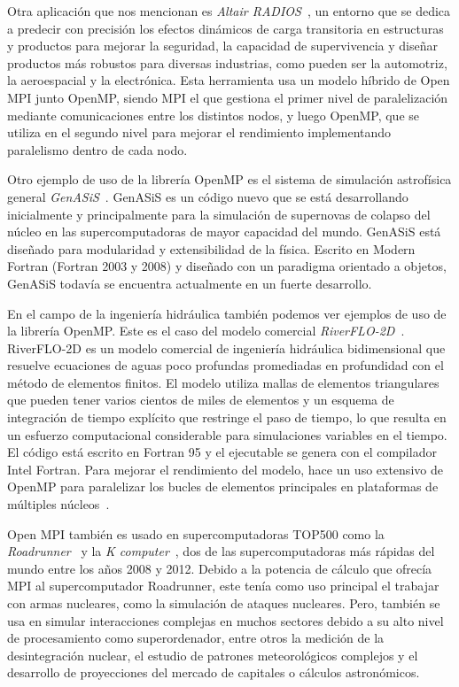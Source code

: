 \documentclass[a4paper,12pt]{article}
\begin{document}
Otra aplicación que nos mencionan es {\it Altair RADIOS}~\cite{altair}, un entorno que se dedica a predecir con precisión los efectos dinámicos de carga transitoria en estructuras y productos para mejorar la seguridad, la capacidad de supervivencia y diseñar productos más robustos para diversas industrias, como pueden ser la automotriz, la aeroespacial y la electrónica. Esta herramienta usa un modelo híbrido de Open MPI junto OpenMP, siendo MPI el que gestiona el primer nivel de paralelización mediante comunicaciones entre los distintos nodos, y luego OpenMP, que se utiliza en el segundo nivel para mejorar el rendimiento implementando paralelismo dentro de cada nodo.


Otro ejemplo de uso de la librería OpenMP es el sistema de simulación astrofísica general {\it GenASiS}~\cite{genasis}. GenASiS es un código nuevo que se está desarrollando inicialmente y principalmente para la simulación de supernovas de colapso del núcleo en las supercomputadoras de mayor capacidad del mundo. GenASiS está diseñado para modularidad y extensibilidad de la física. Escrito en Modern Fortran (Fortran 2003 y 2008) y diseñado con un paradigma orientado a objetos, GenASiS todavía se encuentra actualmente en un fuerte desarrollo.

En el campo de la ingeniería hidráulica también podemos ver ejemplos de uso de la librería OpenMP. Este es el caso del modelo comercial {\it RiverFLO-2D}~\cite{riverflo2d}. RiverFLO-2D es un modelo comercial de ingeniería hidráulica bidimensional que resuelve ecuaciones de aguas poco profundas promediadas en profundidad con el método de elementos finitos. El modelo utiliza mallas de elementos triangulares que pueden tener varios cientos de miles de elementos y un esquema de integración de tiempo explícito que restringe el paso de tiempo, lo que resulta en un esfuerzo computacional considerable para simulaciones variables en el tiempo. El código está escrito en Fortran 95 y el ejecutable se genera con el compilador Intel Fortran. Para mejorar el rendimiento del modelo, hace un uso extensivo de OpenMP para paralelizar los bucles de elementos principales en plataformas de múltiples núcleos~\cite{who}.


Open MPI también es usado en supercomputadoras TOP500 como la {\it Roadrunner}~\cite{super1} y la {\it K computer}~\cite{super2}, dos de las supercomputadoras más rápidas del mundo entre los años 2008 y 2012. Debido a la potencia de cálculo que ofrecía MPI al supercomputador Roadrunner, este tenía como uso principal el trabajar con armas nucleares, como la simulación de ataques nucleares. Pero, también se usa en simular interacciones complejas en muchos sectores debido a su alto nivel de procesamiento como superordenador, entre otros la medición de la desintegración nuclear, el estudio de patrones meteorológicos complejos y el desarrollo de proyecciones del mercado de capitales o cálculos astronómicos.
\end{document}
